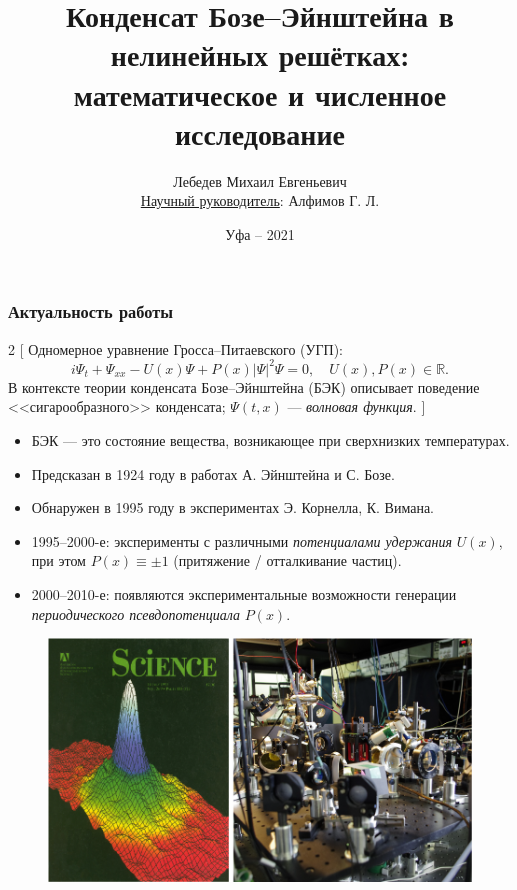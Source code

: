 \documentclass [10pt] {beamer}
\title{Конденсат Бозе--Эйнштейна в нелинейных решётках: математическое и численное исследование}
\author{Лебедев Михаил Евгеньевич \\ \underline{Научный руководитель}: Алфимов Г. Л.}
\institute{
	Институт математики с вычислительным центром \\ УФИЦ РАН \\
	\medskip
	\textit{gloriouslair@gmail.com}
}
\date{Уфа -- 2021}
\begin{document}
\begin{frame}
	\titlepage
\end{frame}

\begin{frame}
	\frametitle{Актуальность работы}

	\begin{multicols}{2}
	[
	Одномерное уравнение Гросса--Питаевского (УГП):
	\begin{equation}
		i \Psi_t + \Psi_{xx} - U(x) \Psi + P(x) |\Psi|^2 \Psi = 0, \quad U(x), P(x) \in \mathbb{R}.
		\label{eq:gpe}
	\end{equation}
	В контексте теории конденсата Бозе--Эйнштейна (БЭК) описывает поведение <<сигарообразного>> конденсата; $\Psi(t, x)$ --- {\it \color{ceruleanblue} волновая функция}.
	]
	
	\begin{small}	
	\begin{itemize}
		\setlength\itemsep{5pt}
		\item БЭК --- это состояние вещества, возникающее при сверхнизких температурах.
		\item Предсказан в 1924 году в работах А. Эйнштейна и С. Бозе.
		\item Обнаружен в 1995 году в экспериментах Э. Корнелла, К. Вимана.
		\item 1995--2000-е: эксперименты с различными {\it \color{ceruleanblue} потенциалами удержания} $U(x)$, при этом $P(x) \equiv \pm 1$ (притяжение / отталкивание частиц).
		\item 2000--2010-е: появляются экспериментальные возможности генерации {\it \color{ceruleanblue} периодического псевдопотенциала} $P(x)$.
	\end{itemize}
	\end{small}
	\begin{figure}
		\includegraphics[scale=0.35]{pic/condensate.png}
	\end{figure}
	\end{multicols}
\end{frame}
\end{document}
